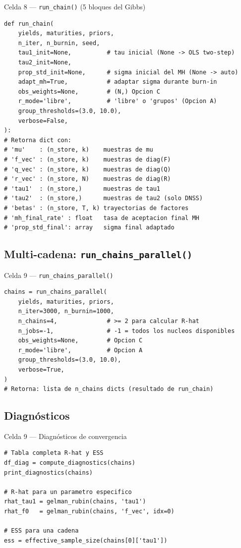 \documentclass[12pt, a4paper]{article}
\theoremstyle{plain}
\theoremstyle{definition}
\theoremstyle{remark}
\begin{document}
\begin{codigocaja}{Celda 8 — \texttt{run\_chain()} (5 bloques del Gibbs)}
\begin{lstlisting}
def run_chain(
    yields, maturities, priors,
    n_iter, n_burnin, seed,
    tau1_init=None,          # tau inicial (None -> OLS two-step)
    tau2_init=None,
    prop_std_init=None,      # sigma inicial del MH (None -> auto)
    adapt_mh=True,           # adaptar sigma durante burn-in
    obs_weights=None,        # (N,) Opcion C
    r_mode='libre',          # 'libre' o 'grupos' (Opcion A)
    group_thresholds=(3.0, 10.0),
    verbose=False,
):
# Retorna dict con:
# 'mu'    : (n_store, k)    muestras de mu
# 'f_vec' : (n_store, k)    muestras de diag(F)
# 'q_vec' : (n_store, k)    muestras de diag(Q)
# 'r_vec' : (n_store, N)    muestras de diag(R)
# 'tau1'  : (n_store,)      muestras de tau1
# 'tau2'  : (n_store,)      muestras de tau2 (solo DNSS)
# 'betas' : (n_store, T, k) trayectorias de factores
# 'mh_final_rate' : float   tasa de aceptacion final MH
# 'prop_std_final': array   sigma final adaptado
\end{lstlisting}
\end{codigocaja}

\subsection{Multi-cadena: \texttt{run\_chains\_parallel()}}

\begin{codigocaja}{Celda 9 — \texttt{run\_chains\_parallel()}}
\begin{lstlisting}
chains = run_chains_parallel(
    yields, maturities, priors,
    n_iter=3000, n_burnin=1000,
    n_chains=4,              # >= 2 para calcular R-hat
    n_jobs=-1,               # -1 = todos los nucleos disponibles
    obs_weights=None,        # Opcion C
    r_mode='libre',          # Opcion A
    group_thresholds=(3.0, 10.0),
    verbose=True,
)
# Retorna: lista de n_chains dicts (resultado de run_chain)
\end{lstlisting}
\end{codigocaja}

\subsection{Diagnósticos}

\begin{codigocaja}{Celda 9 — Diagnósticos de convergencia}
\begin{lstlisting}
# Tabla completa R-hat y ESS
df_diag = compute_diagnostics(chains)
print_diagnostics(chains)

# R-hat para un parametro especifico
rhat_tau1 = gelman_rubin(chains, 'tau1')
rhat_f0   = gelman_rubin(chains, 'f_vec', idx=0)

# ESS para una cadena
ess = effective_sample_size(chains[0]['tau1'])
\end{lstlisting}
\end{codigocaja}
\end{document}
